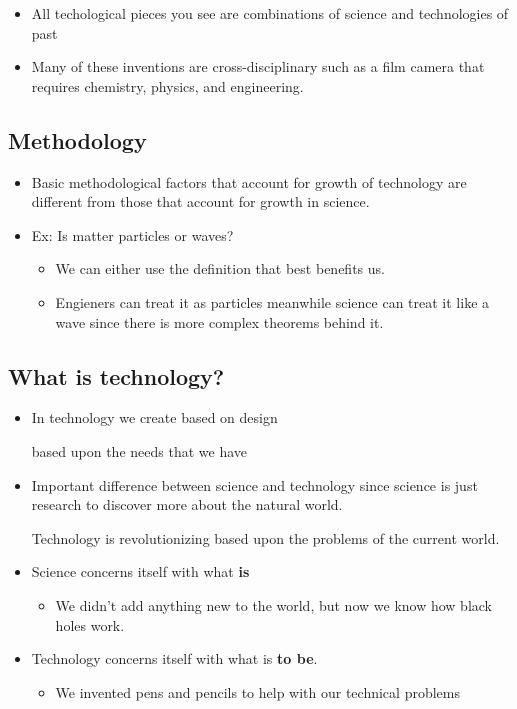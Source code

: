 \documentclass{article}
\begin{document}
\begin{itemize}
  \item All techological pieces you see are combinations of
    science and technologies of past
  \item Many of these inventions are cross-disciplinary
    such as a film camera that requires
    chemistry, physics, and engineering.
\end{itemize}

\subsection{Methodology}
\begin{itemize}
  \item Basic methodological factors that account for
    growth of technology are different from those
    that account for growth in science.
  \item Ex: Is matter particles or waves?
    \begin{itemize}
      \item We can either use the definition that
        best benefits us.
      \item Engieners can treat it as particles
        meanwhile science can treat it like a wave
        since there is more complex theorems behind it.
    \end{itemize}
\end{itemize}

\subsection{What is technology?}
\begin{itemize}
  \item In technology we create based on design

    based upon the needs that we have
  \item Important difference between science and technology
    since science is just research to discover more
    about the natural world.

    Technology is revolutionizing based upon the problems of the
    current world.
  \item Science concerns itself with what \textbf{is}
    \begin{itemize}
      \item We didn't add anything new to the world,
        but now we know how black holes work.
    \end{itemize}
  \item Technology concerns itself with what is \textbf{to be}.
    \begin{itemize}
      \item We invented pens and pencils to help
        with our technical problems
    \end{itemize}
\end{itemize}
\end{document}

